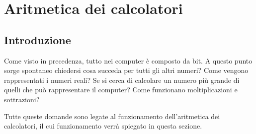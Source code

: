 \documentclass[a4paper,12pt]{article}
\theoremstyle{break}
\numberwithin{equation}{section}
\begin{document}
\section{Aritmetica dei calcolatori}
\subsection{Introduzione}
Come visto in precedenza, tutto nei computer è composto da bit. A questo punto sorge spontaneo chiedersi cosa succeda per tutti gli altri numeri? Come vengono rappresentati i numeri reali? Se si cerca di calcolare un numero più grande di quelli che può rappresentare il computer? Come funzionano moltiplicazioni e sottrazioni? 

Tutte queste domande sono legate al funzionamento dell'aritmetica dei calcolatori, il cui funzionamento verrà spiegato in questa sezione.
\end{document}
